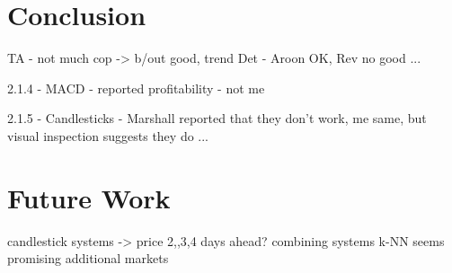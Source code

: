\section{Conclusion}

TA - not much cop -> b/out good, trend Det - Aroon OK, Rev no good ...

2.1.4 - MACD - reported profitability - not me

2.1.5 - Candlesticks - Marshall reported that they don't work, me same, but visual inspection suggests they do ...

\section{Future Work}
candlestick systems -> price 2,,3,4 days ahead?
combining systems
k-NN seems promising
additional markets
